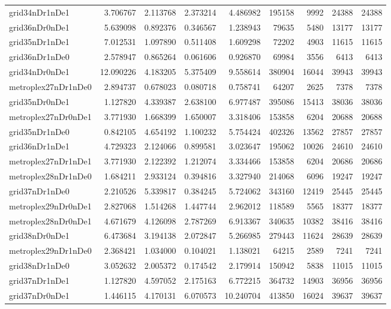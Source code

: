 \begin{longtable}{|l|r|r|r|r|r|r|r|r|}
grid34nDr1nDe1 & 3.706767 & 2.113768 & 2.373214 & 4.486982 & 195158 & 9992 & 24388 & 24388 \\
grid36nDr0nDe1 & 5.639098 & 0.892376 & 0.346567 & 1.238943 & 79635 & 5480 & 13177 & 13177 \\
grid35nDr1nDe1 & 7.012531 & 1.097890 & 0.511408 & 1.609298 & 72202 & 4903 & 11615 & 11615 \\
grid36nDr1nDe0 & 2.578947 & 0.865264 & 0.061606 & 0.926870 & 69984 & 3556 & 6413 & 6413 \\
grid34nDr0nDe1 & 12.090226 & 4.183205 & 5.375409 & 9.558614 & 380904 & 16044 & 39943 & 39943 \\
metroplex27nDr1nDe0 & 2.894737 & 0.678023 & 0.080718 & 0.758741 & 64207 & 2625 & 7378 & 7378 \\
grid35nDr0nDe1 & 1.127820 & 4.339387 & 2.638100 & 6.977487 & 395086 & 15413 & 38036 & 38036 \\
metroplex27nDr0nDe1 & 3.771930 & 1.668399 & 1.650007 & 3.318406 & 153858 & 6204 & 20688 & 20688 \\
grid35nDr1nDe0 & 0.842105 & 4.654192 & 1.100232 & 5.754424 & 402326 & 13562 & 27857 & 27857 \\
grid36nDr1nDe1 & 4.729323 & 2.124066 & 0.899581 & 3.023647 & 195062 & 10026 & 24610 & 24610 \\
metroplex27nDr1nDe1 & 3.771930 & 2.122392 & 1.212074 & 3.334466 & 153858 & 6204 & 20686 & 20686 \\
metroplex28nDr1nDe0 & 1.684211 & 2.933124 & 0.394816 & 3.327940 & 214068 & 6096 & 19247 & 19247 \\
grid37nDr1nDe0 & 2.210526 & 5.339817 & 0.384245 & 5.724062 & 343160 & 12419 & 25445 & 25445 \\
metroplex29nDr0nDe1 & 2.827068 & 1.514268 & 1.447744 & 2.962012 & 118589 & 5565 & 18377 & 18377 \\
metroplex28nDr0nDe1 & 4.671679 & 4.126098 & 2.787269 & 6.913367 & 340635 & 10382 & 38416 & 38416 \\
grid38nDr0nDe1 & 6.473684 & 3.194138 & 2.072847 & 5.266985 & 279443 & 11624 & 28639 & 28639 \\
metroplex29nDr1nDe0 & 2.368421 & 1.034000 & 0.104021 & 1.138021 & 64215 & 2589 & 7241 & 7241 \\
grid38nDr1nDe0 & 3.052632 & 2.005372 & 0.174542 & 2.179914 & 150942 & 5838 & 11015 & 11015 \\
grid37nDr1nDe1 & 1.127820 & 4.597052 & 2.175163 & 6.772215 & 364732 & 14903 & 36956 & 36956 \\
grid37nDr0nDe1 & 1.446115 & 4.170131 & 6.070573 & 10.240704 & 413850 & 16024 & 39637 & 39637 \\

\end{longtable}
